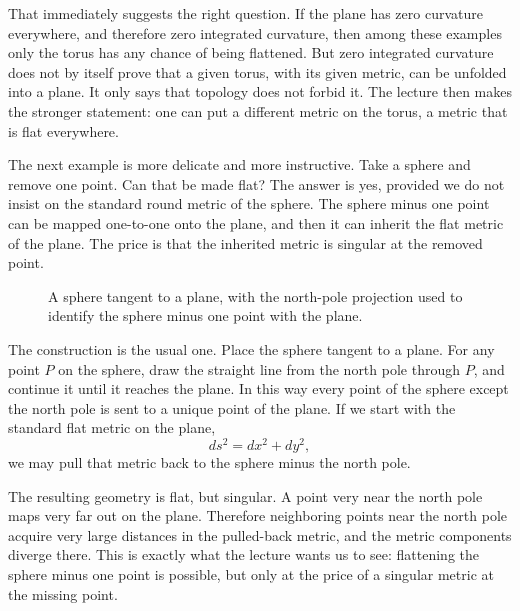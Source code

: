 That immediately suggests the right question. If the plane has zero curvature everywhere, and therefore zero integrated curvature, then among these examples only the torus has any chance of being flattened. But zero integrated curvature does not by itself prove that a given torus, with its given metric, can be unfolded into a plane. It only says that topology does not forbid it. The lecture then makes the stronger statement: one can put a different metric on the torus, a metric that is flat everywhere.

The next example is more delicate and more instructive. Take a sphere and remove one point. Can that be made flat? The answer is yes, provided we do not insist on the standard round metric of the sphere. The sphere minus one point can be mapped one-to-one onto the plane, and then it can inherit the flat metric of the plane. The price is that the inherited metric is singular at the removed point.

\begin{figure}[t]
\centering
{}
\caption{A sphere tangent to a plane, with the north-pole projection used to identify the sphere minus one point with the plane.}
\end{figure}

The construction is the usual one. Place the sphere tangent to a plane. For any point \(P\) on the sphere, draw the straight line from the north pole through \(P\), and continue it until it reaches the plane. In this way every point of the sphere except the north pole is sent to a unique point of the plane. If we start with the standard flat metric on the plane,
\begin{equation}
ds^2 = dx^2 + dy^2,
\end{equation}
we may pull that metric back to the sphere minus the north pole.

The resulting geometry is flat, but singular. A point very near the north pole maps very far out on the plane. Therefore neighboring points near the north pole acquire very large distances in the pulled-back metric, and the metric components diverge there. This is exactly what the lecture wants us to see: flattening the sphere minus one point is possible, but only at the price of a singular metric at the missing point.

